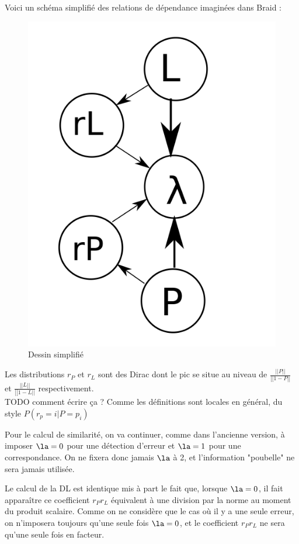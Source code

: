 \documentclass{article}
\begin{document}
Voici un schéma simplifié des relations de dépendance imaginées dans Braid : 
\begin{figure}[H]
\centering
	\includegraphics[scale=0.2]{dessin.png}
	\caption{Dessin simplifié}
	\label{Setup}
\end{figure} 

Les distributions $r_P$ et $r_L$ sont des Dirac dont le pic se situe au niveau de $\frac{||P||}{[[1-P||}$ et $\frac{||L||}{[[1-L||}$ respectivement.\\
TODO comment écrire ça ? Comme les définitions sont locales en général, du style $P(r_p=i|P=p_i)$



Pour le calcul de similarité, on va continuer, comme dans l'ancienne version, à imposer $\la=0$ pour une détection d'erreur et $\la=1$ pour une correspondance. On ne fixera donc jamais $\la$ à 2, et l'information "poubelle" ne sera jamais utilisée.

Le calcul de la DL est identique mis à part le fait que, lorsque $\la=0$, il fait apparaître ce coefficient $r_Pr_L$ équivalent à une division par la norme au moment du produit scalaire. Comme on ne considère que le cas où il y a une seule erreur, on n'imposera toujours qu'une seule fois $\la=0$, et le coefficient $r_Pr_L$ ne sera qu'une seule fois en facteur.
\end{document}
